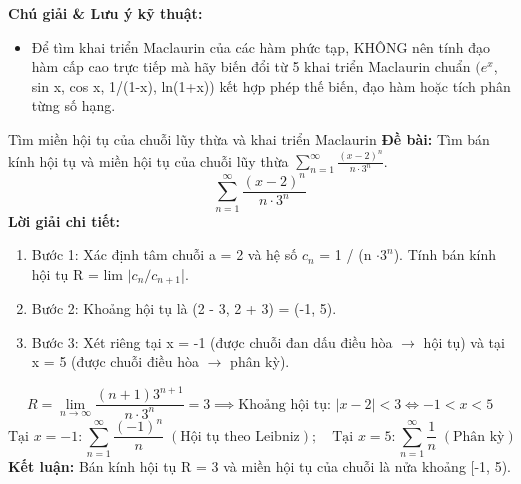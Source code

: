 \documentclass[11pt,a4paper,oneside]{book}
\begin{document}
\noindent\textbf{Chú giải \& Lưu ý kỹ thuật:}
\begin{itemize}[leftmargin=1.5em, itemsep=2pt]
  \item Để tìm khai triển Maclaurin của các hàm phức tạp, KHÔNG nên tính đạo hàm cấp cao trực tiếp mà hãy biến đổi từ 5 khai triển Maclaurin chuẩn $(e^x$, sin x, cos x, 1/(1-x), ln(1+x)) kết hợp phép thế biến, đạo hàm hoặc tích phân từng số hạng.
\end{itemize}

\begin{vidu}{Tìm miền hội tụ của chuỗi lũy thừa và khai triển Maclaurin}
\textbf{Đề bài:} Tìm bán kính hội tụ và miền hội tụ của chuỗi lũy thừa $\sum_{n=1}^\infty \frac{(x - 2)^n}{n \cdot 3^n}$.
\[ \sum_{n=1}^\infty \frac{(x - 2)^n}{n \cdot 3^n} \]
\textbf{Lời giải chi tiết:}
\begin{enumerate}[leftmargin=1.5em, itemsep=2pt]
  \item Bước 1: Xác định tâm chuỗi a = 2 và hệ số $c_n$ = 1 / (n $\cdot 3^n$). Tính bán kính hội tụ R = lim $|c_n / c_{n+1}$|.
  \item Bước 2: Khoảng hội tụ là (2 - 3, 2 + 3) = (-1, 5).
  \item Bước 3: Xét riêng tại x = -1 (được chuỗi đan dấu điều hòa $\to$  hội tụ) và tại x = 5 (được chuỗi điều hòa $\to$  phân kỳ).
\end{enumerate}
\[ R = \lim_{n \to \infty} \frac{(n + 1)3^{n+1}}{n \cdot 3^n} = 3 \implies \text{Khoảng hội tụ: } |x - 2| < 3 \iff -1 < x < 5 \]
\[ \text{Tại } x = -1: \sum_{n=1}^\infty \frac{(-1)^n}{n} \;(\text{Hội tụ theo Leibniz}); \quad \text{Tại } x = 5: \sum_{n=1}^\infty \frac{1}{n} \;(\text{Phân kỳ}) \]
\noindent\textbf{Kết luận:} Bán kính hội tụ R = 3 và miền hội tụ của chuỗi là nửa khoảng [-1, 5).
\end{vidu}
\end{document}
